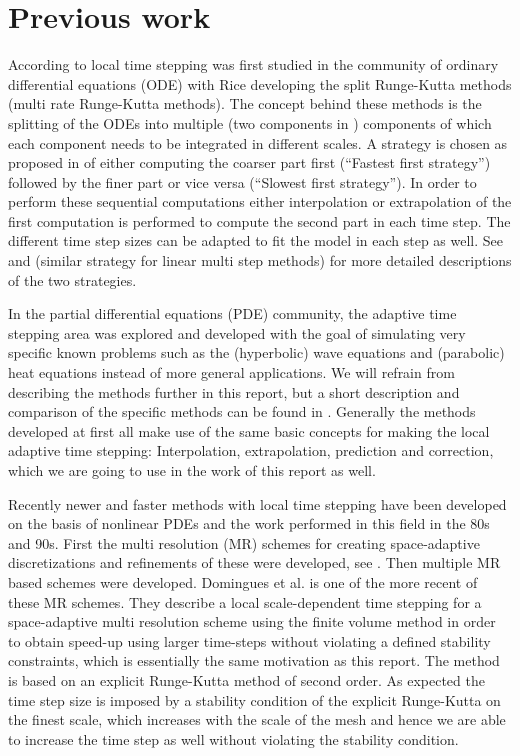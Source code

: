 \documentclass[11pt]{article}
\begin{document}

\section{Previous work} According to \cite{Gander:2013} local time stepping
was first studied in the community of ordinary differential equations (ODE)
with Rice \cite{rice:1960} developing the split Runge-Kutta methods (multi
rate Runge-Kutta methods). The concept behind these methods is the splitting
of the ODEs into multiple (two components in \cite{rice:1960}) components of
which each component needs to be integrated in different scales. A strategy
is chosen as proposed in \cite{Kvaernoe:1999} of either computing the coarser
part first (``Fastest first strategy'') followed by the finer part or vice
versa (``Slowest first strategy''). In order to perform these sequential
computations either interpolation or extrapolation of the first computation
is performed to compute the second part in each time step. The different
time step sizes can be adapted to fit the model in each step as well. See
\cite{Kvaernoe:1999} and \cite{Gear:1984} (similar strategy for linear multi
step methods) for more detailed descriptions of the two strategies.

In the partial differential equations (PDE) community, the adaptive time
stepping area was explored and developed with the goal of simulating
very specific known problems such as the (hyperbolic) wave equations
and (parabolic) heat equations instead of more general applications. We
will refrain from describing the methods further in this report, but a
short description and comparison of the specific methods can be found in
\cite{Gander:2013}. Generally the methods developed at first all make use
of the same basic concepts for making the local adaptive time stepping:
Interpolation, extrapolation, prediction and correction, which we are going to
use in the work of this report as well.

Recently newer and faster methods with local time stepping have been developed
on the basis of nonlinear PDEs and the work performed in this field in
the 80s and 90s. First the multi resolution (MR) schemes for creating
space-adaptive discretizations and refinements of these were developed, see
\cite{Berger:1984}. Then multiple MR based schemes were developed. Domingues
et al. \cite{Domingues:2008} is one of the more recent of these MR schemes.
They describe a local scale-dependent time stepping for a space-adaptive multi
resolution scheme using the finite volume method in order to obtain speed-up
using larger time-steps without violating a defined stability constraints,
which is essentially the same motivation as this report. The method is based
on an explicit Runge-Kutta method of second order. As expected the time step
size is imposed by a stability condition of the explicit Runge-Kutta on the
finest scale, which increases with the scale of the mesh and hence we are able
to increase the time step as well without violating the stability condition.
\end{document}
